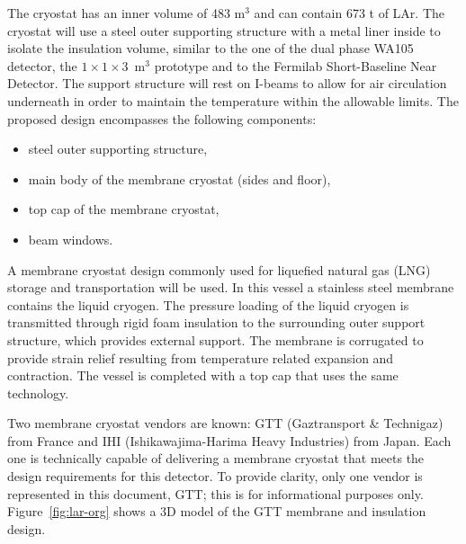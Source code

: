The cryostat has an inner volume of 483 m$^3$ and can contain  673 t of LAr.
%
%
The cryostat will use a steel outer supporting structure with a metal liner inside to isolate the insulation volume, similar to the one of the dual phase WA105 detector, the $1\times1\times3$~m$^3$ prototype and to the Fermilab Short-Baseline Near Detector. 
The support structure will rest on I-beams to allow for air circulation underneath in order to maintain the temperature within the allowable limits. The proposed design encompasses the following components:
%
\begin{itemize}
\item steel outer supporting structure,
\item main body of the membrane cryostat (sides and floor), 
\item top cap of the membrane cryostat,
\item beam windows.
\end{itemize}
%
A membrane cryostat design commonly used for liquefied natural gas (LNG) storage and transportation will be used. In this vessel a stainless steel membrane contains the liquid cryogen. The pressure loading of the liquid cryogen is transmitted through rigid foam insulation to the surrounding outer support structure, which provides external support. The membrane is corrugated to provide strain relief resulting from temperature related expansion and contraction. The vessel is completed with a top cap that uses the same technology.

Two membrane cryostat vendors are known: GTT (Gaztransport \& Technigaz) from France and IHI (Ishikawajima-Harima Heavy Industries) from Japan. Each one is technically capable of delivering a membrane cryostat that meets the design requirements for this detector. To provide clarity, only one vendor is represented in this document, GTT; this is for informational purposes only. Figure~\ref{fig:lar-org} shows a 3D model of the GTT membrane and insulation design.

